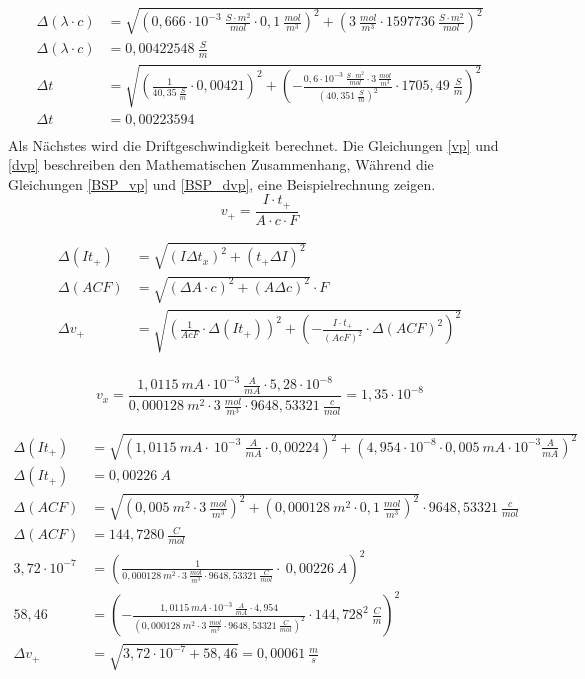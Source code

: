 \begin{align}
\Delta (\lambda\cdot c) &= \sqrt{ (0,666\cdot 10^{-3}\ \frac{S\cdot m^2}{mol}\cdot 0,1\ \frac{mol}{m^3})^2 + (3\ \frac{mol}{m^3}\cdot 1597736\ \frac{S\cdot m^2}{mol})^2} \\
\Delta (\lambda\cdot c) &= 0,00422548\ \frac{S}{m}\label{BSP_dlc}\\
\Delta t &= \sqrt{ \left(\frac{1}{40,35\ \frac{S}{m}}\cdot 0,00421\right)^2 + \left(-\frac{0,6\cdot 10^{-3}\ \frac{S\cdot m^2}{mol}\cdot 3\ \frac{mol}{m^3}}{(40,351\ \frac{S}{m})^2}\cdot 1705,49\ \frac{S}{m}\right)^2} \label{BSP_dt}\\
\Delta t &= 0,00223594\\
\end{align}
Als Nächstes wird die Driftgeschwindigkeit berechnet. 
Die Gleichungen \ref{vp} und \ref{dvp} beschreiben den Mathematischen Zusammenhang, Während die Gleichungen \ref{BSP_vp} und \ref{BSP_dvp}, eine Beispielrechnung zeigen.
\begin{equation}
v_+ = \frac{I\cdot t_+}{A\cdot c\cdot F}
\label{vp}
\end{equation}

\begin{align}
\Delta(It_+) &= \sqrt{(I\Delta t_x)^2 + (t_+\Delta I)^2}\\
\Delta(ACF) &= \sqrt{ (\Delta A\cdot c)^2 + (A\Delta c)^2} \cdot F\\
\Delta v_+ &= \sqrt{\left(\frac{1}{AcF}\cdot\Delta(It_+)\right)^2 + \left(-\frac{I\cdot t_+}{(AcF)^2}\cdot\Delta(ACF)^2\right)^2}\label{dvp}\\
\end{align}

\begin{equation}
v_x = \frac{1,0115\ mA\cdot 10^{-3}\ \frac{A}{mA}\cdot 5,28\cdot 10^{-8}}{0,000128\ m^2\cdot 3\ \frac{mol}{m^3}\cdot 9648,53321\ \frac{c}{mol}} = 1,35\cdot 10^{-8}
\label{BSP_vp}
\end{equation}


\begin{align}
\Delta(It_+) &= \sqrt{(1,0115\ mA\cdot\ 10^{-3}\ \frac{A}{mA}\cdot 0,00224)^2 + (4,954\cdot 10^{-8}\cdot 0,005\ mA\cdot 10^{-3}\frac{A}{mA})^2}\\
\Delta(It_+) &= 0,00226\ A\\
\Delta(ACF) &= \sqrt{ (0,005\ m^2\cdot 3\ \frac{mol}{m^3})^2 + (0,000128\ m^2\cdot 0,1\ \frac{mol}{m^3})^2} \cdot 9648,53321\ \frac{c}{mol}\\
\Delta(ACF) &= 144,7280\ \frac{C}{mol}\\
3,72\cdot 10^{-7} &= \left(\frac{1}{0,000128\ m^2\cdot 3\ \frac{mol}{m^3}\cdot 9648,53321\ \frac{C}{mol}}\cdot\ 0,00226\ A\right)^2\\
58,46 &= \left(-\frac{1,0115\ mA\cdot 10^{-3}\ \frac{A}{mA}\cdot 4,954}{(0,000128\ m^2\cdot 3\ \frac{mol}{m^3}\cdot 9648,53321\ \frac{C}{mol})^2}\cdot 144,728^2\ \frac{C}{m}\right)^2 \label{BSP_dvp}\\
\Delta v_+ &= \sqrt{ 3,72\cdot 10^{-7} + 58,46} = 0,00061\ \frac{m}{s} \label{dvp}\\
\end{align}

